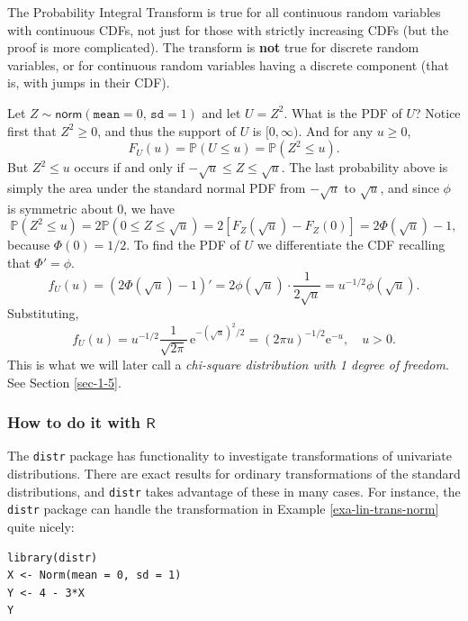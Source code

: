 \documentclass[captions=tableheading]{scrbook}
\begin{document}
\begin{fact}
The Probability Integral Transform is true for all continuous random variables with continuous CDFs, not just for those with strictly increasing CDFs (but the proof is more complicated). The transform is \textbf{not} true for discrete random variables, or for continuous random variables having a discrete component (that is, with jumps in their CDF).
\end{fact}

\begin{example}
Let \(Z\sim\mathsf{norm}(\mathtt{mean}=0,\,\mathtt{sd}=1)\) and let \(U=Z^{2}\). What is the PDF of \(U\)? 
Notice first that \(Z^{2}\geq0\), and thus the support of \(U\) is \([0,\infty)\). And for any \(u\geq0\), 
\[
F_{U}(u)=\mathbb{P}(U\leq u)=\mathbb{P}(Z^{2}\leq u).
\]
But \(Z^{2}\leq u\) occurs if and only if \(-\sqrt{u}\leq Z\leq\sqrt{u}\). The last probability above is simply the area under the standard normal PDF from \(-\sqrt{u}\) to \(\sqrt{u}\), and since \(\phi\) is symmetric about 0, we have
\[
\mathbb{P}(Z^{2}\leq u)=2\mathbb{P}(0\leq Z\leq\sqrt{u})=2\left[F_{Z}(\sqrt{u})-F_{Z}(0)\right]=2\Phi(\sqrt{u})-1,
\]
because \(\Phi(0)=1/2\). To find the PDF of \(U\) we differentiate the CDF recalling that \(\Phi'=\phi\).
\[
f_{U}(u)=\left(2\Phi(\sqrt{u})-1\right)'=2\phi(\sqrt{u})\cdot\frac{1}{2\sqrt{u}}=u^{-1/2}\phi(\sqrt{u}).
\]
Substituting,
\[
f_{U}(u)=u^{-1/2}\frac{1}{\sqrt{2\pi}}\,\mathrm{e}^{-(\sqrt{u})^{2}/2}=(2\pi u)^{-1/2}\mathrm{e}^{-u},\quad u>0.
\]
This is what we will later call a \emph{chi-square distribution with 1 degree of freedom}. See Section \ref{sec-1-5}.
\end{example}
\subsubsection{How to do it with \(\mathsf{R}\)}
\label{sec-1-4-2-1}


The \texttt{distr} package has functionality to investigate transformations of univariate distributions. There are exact results for ordinary transformations of the standard distributions, and \texttt{distr} takes advantage of these in many cases. For instance, the \texttt{distr} package can handle the transformation in Example \ref{exa-lin-trans-norm} quite nicely:


\lstset{language=R}
\begin{lstlisting}
library(distr)
X <- Norm(mean = 0, sd = 1)
Y <- 4 - 3*X
Y
\end{lstlisting}
\end{document}
